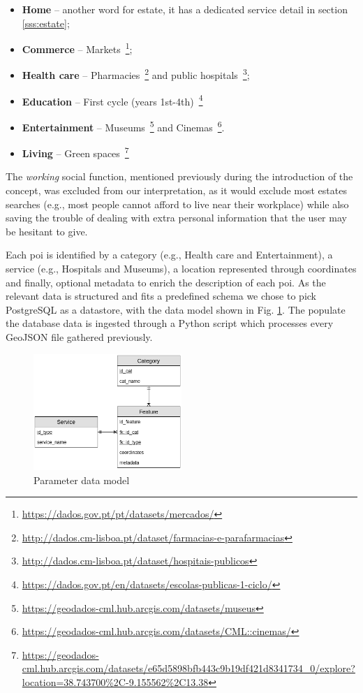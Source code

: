 \begin{itemize}
    \item \textbf{Home} -- another word for estate, it has a dedicated service detail in section \ref{sss:estate};
    \item \textbf{Commerce} -- Markets~\footnote{\url{https://dados.gov.pt/pt/datasets/mercados/}};
    \item \textbf{Health care} -- Pharmacies~\footnote{\url{http://dados.cm-lisboa.pt/dataset/farmacias-e-parafarmacias}} and public hospitals~\footnote{\url{http://dados.cm-lisboa.pt/dataset/hospitais-publicos}};
    \item \textbf{Education} -- First cycle (years 1st-4th)~\footnote{\url{https://dados.gov.pt/en/datasets/escolas-publicas-1-ciclo/}}
    \item \textbf{Entertainment} -- Museums~\footnote{\url{https://geodados-cml.hub.arcgis.com/datasets/museus}} and Cinemas~\footnote{\url{https://geodados-cml.hub.arcgis.com/datasets/CML::cinemas/}}.
    \item \textbf{Living} -- Green spaces~\footnote{\url{https://geodados-cml.hub.arcgis.com/datasets/e65d5898bfb443c9b19df421d8341734_0/explore?location=38.743700\%2C-9.155562\%2C13.38}}
\end{itemize}

The \textit{working} social function, mentioned previously during the introduction of the concept, was excluded from our interpretation, as it would exclude most estates searches (e.g., most people cannot afford to live near their workplace) while also saving the trouble of dealing with extra personal information that the user may be hesitant to give.

Each \acrshort{poi} is identified by a category (e.g., Health care and Entertainment), a service (e.g., Hospitals and Museums), a location represented through coordinates and finally, optional metadata to enrich the description of each \acrshort{poi}. As the relevant data is structured and fits a predefined schema we chose to pick PostgreSQL as a datastore, with the data model shown in Fig. \ref{fig:ea-params}. The populate the database data is ingested through a Python script which processes every GeoJSON file gathered previously.

\begin{figure}[h]
    \centering
    \includegraphics[width=0.5\textwidth,clip]{Chapters/img/backend/ea-params.png} 
    \caption{Parameter data model} 
    \label{fig:ea-params}
\end{figure}

